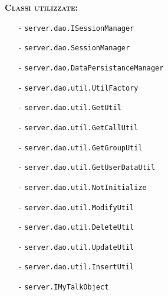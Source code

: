\begin{description}
	\item{\scshape\bfseries Classi utilizzate:}
	\begin{itemize}[nolistsep, noitemsep]
	  \item[-] \texttt{server.dao.ISessionManager}
	  \item[-] \texttt{server.dao.SessionManager}
	  \item[-] \texttt{server.dao.DataPersistanceManager}
	  \item[-] \texttt{server.dao.util.UtilFactory}
	  \item[-] \texttt{server.dao.util.GetUtil}
	  \item[-] \texttt{server.dao.util.GetCallUtil}
	  \item[-] \texttt{server.dao.util.GetGroupUtil}
	  \item[-] \texttt{server.dao.util.GetUserDataUtil}
	  \item[-] \texttt{server.dao.util.NotInitialize}
	  \item[-] \texttt{server.dao.util.ModifyUtil}
	  \item[-] \texttt{server.dao.util.DeleteUtil}
	  \item[-] \texttt{server.dao.util.UpdateUtil}
	  \item[-] \texttt{server.dao.util.InsertUtil}
	  \item[-] \texttt{server.IMyTalkObject}
	  
	\end{itemize}
\end{description}

